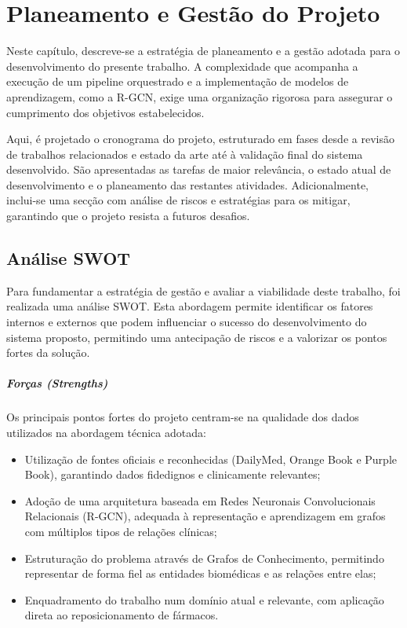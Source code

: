 % 
%  
%
\chapter{Planeamento e Gestão do Projeto}
\label{cha:planeamento e gestao}
Neste capítulo, descreve-se a estratégia de planeamento e a gestão adotada para o desenvolvimento do presente trabalho. A complexidade que acompanha a execução de um pipeline orquestrado e a implementação de modelos de aprendizagem, como a R-GCN, exige uma organização rigorosa para assegurar o cumprimento dos objetivos estabelecidos.

Aqui, é projetado o cronograma do projeto, estruturado em fases desde a revisão de trabalhos relacionados e estado da arte até à validação final do sistema desenvolvido. São apresentadas as tarefas de maior relevância, o estado atual de desenvolvimento e o planeamento das restantes atividades. Adicionalmente, inclui-se uma secção com análise de riscos e estratégias para os mitigar, garantindo que o projeto resista a futuros desafios.

\section{Análise SWOT}
\label{sec:swot}
Para fundamentar a estratégia de gestão e avaliar a viabilidade deste trabalho, foi realizada uma análise SWOT. Esta abordagem permite identificar os fatores internos e externos que podem influenciar o sucesso do desenvolvimento do sistema proposto, permitindo uma antecipação de riscos e a valorizar os pontos fortes da solução.

\paragraph{Forças (Strengths)}
Os principais pontos fortes do projeto centram-se na qualidade dos dados utilizados na abordagem técnica adotada:
\begin{itemize}
    \item Utilização de fontes oficiais e reconhecidas (DailyMed, Orange Book e Purple Book), garantindo dados fidedignos e clinicamente relevantes;
    \item Adoção de uma arquitetura baseada em Redes Neuronais Convolucionais Relacionais (R-GCN), adequada à representação e aprendizagem em grafos com múltiplos tipos de relações clínicas;
    \item Estruturação do problema através de Grafos de Conhecimento, permitindo representar de forma fiel as entidades biomédicas e as relações entre elas;
    \item Enquadramento do trabalho num domínio atual e relevante, com aplicação direta ao reposicionamento de fármacos.
\end{itemize}

